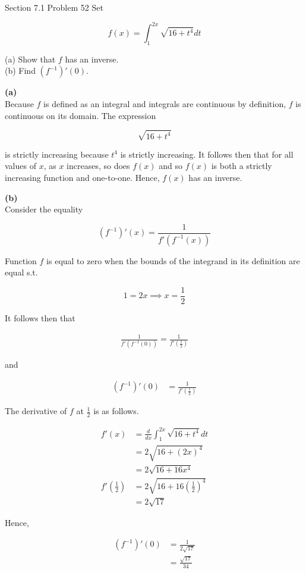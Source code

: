 \documentclass{article}
\begin{document}
    \begin{tbhtheorem}{Section 7.1 Problem 52}
        Set

        \[
            f(x) = \int_1^{2x} \sqrt{16+t^4} dt
        \]

        (a) Show that $f$ has an inverse. \\
        (b) Find $\left(f^{-1}\right)'(0)$.
    \end{tbhtheorem}

    \textbf{(a)} \\
    Because $f$ is defined as an integral and integrals are continuous by definition, $f$ is continuous on its domain. The expression

    \[
        \sqrt{16+t^4}
    \]

    is strictly increasing because $t^4$ is strictly increasing. It follows then that for all values of $x$, as $x$ increases, so does $f(x)$ and so $f(x)$ is both a strictly increasing function and one-to-one. Hence,
    $f(x)$ has an inverse.

    \textbf{(b)} \\
    Consider the equality

    \[
        \left(f^{-1}\right)'(x) = \frac{1}{f'\left(f^{-1}(x)\right)}
    \]

    Function $f$ is equal to zero when the bounds of the integrand in its definition are equal s.t.

    \[
        1 = 2x \implies x = \frac{1}{2}
    \]

    It follows then that

    \begin{align*}
        \frac{1}{f'\left(f^{-1}(0)\right)} = \frac{1}{f'\left(\frac{1}{2}\right)}
    \end{align*}

    and

    \begin{align*}
        \left(f^{-1}\right)'(0) &= \frac{1}{f'\left(\frac{1}{2}\right)}
    \end{align*}

    The derivative of $f$ at $\frac{1}{2}$ is as follows.

    \begin{align*}
        f'(x)   &= \frac{d}{dx}\int_1^{2x}\sqrt{16+t^4}dt \\
                &= 2\sqrt{16+(2x)^4} \\
                &= 2\sqrt{16+16x^4} \\
        f'\left(\frac{1}{2}\right)  &= 2\sqrt{16+16\left(\frac{1}{2}\right)^4} \\
                                    &= 2\sqrt{17}
    \end{align*}

    Hence,

    \begin{align*}
        \left(f^{-1}\right)'(0) &= \frac{1}{2\sqrt{17}} \\
                                &= \frac{\sqrt{17}}{34}
    \end{align*}
\end{document}
